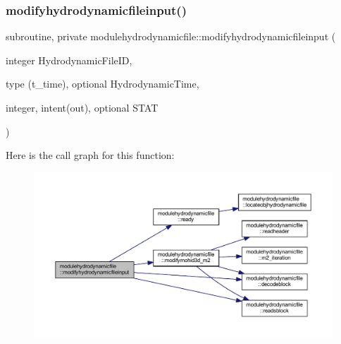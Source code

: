 \subsubsection{\texorpdfstring{modifyhydrodynamicfileinput()}{modifyhydrodynamicfileinput()}}
{\footnotesize\ttfamily subroutine, private modulehydrodynamicfile\+::modifyhydrodynamicfileinput (\begin{DoxyParamCaption}\item[{integer}]{Hydrodynamic\+File\+ID,  }\item[{type (t\+\_\+time), optional}]{Hydrodynamic\+Time,  }\item[{integer, intent(out), optional}]{S\+T\+AT }\end{DoxyParamCaption})\hspace{0.3cm}{\ttfamily [private]}}

Here is the call graph for this function\+:\nopagebreak
\begin{figure}[H]
\begin{center}
\leavevmode
\includegraphics[width=350pt]{namespacemodulehydrodynamicfile_a78cdd03605613d9ae76372179d4bb493_cgraph}
\end{center}
\end{figure}
\mbox{\label{namespacemodulehydrodynamicfile_ab3996472f919cd0d5d57190aa0fca63e}} 
